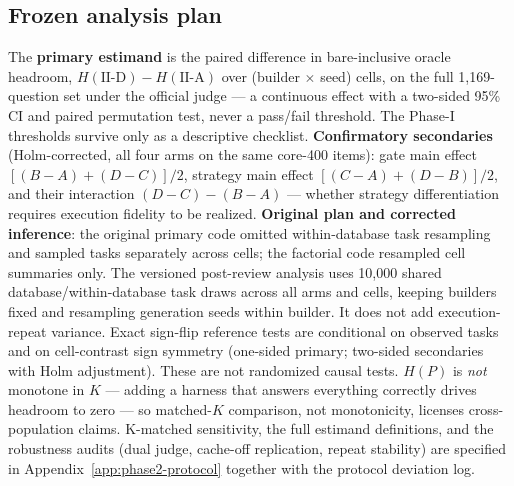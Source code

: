 \subsection{Frozen analysis plan}\label{sec:p2plan}
The \textbf{primary estimand} is the paired difference in bare-inclusive oracle
headroom, $H(\text{II-D}) - H(\text{II-A})$ over (builder $\times$ seed) cells, on
the full 1{,}169-question set under the official judge --- a continuous effect with
a two-sided 95\% CI and paired permutation test, never a pass/fail threshold. The
Phase-I thresholds survive only as a descriptive checklist.
\textbf{Confirmatory secondaries} (Holm-corrected, all four arms on the same
core-400 items): gate main effect $[(B{-}A)+(D{-}C)]/2$, strategy main effect
$[(C{-}A)+(D{-}B)]/2$, and their interaction $(D{-}C)-(B{-}A)$ --- whether strategy
differentiation requires execution fidelity to be realized.
\textbf{Original plan and corrected inference}: the original primary code
omitted within-database task resampling and sampled tasks separately across
cells; the factorial code resampled cell summaries only. The versioned
post-review analysis uses 10{,}000 shared database/within-database task
draws across all arms and cells, keeping builders fixed and resampling
generation seeds within builder. It does not add execution-repeat variance.
Exact sign-flip reference tests are conditional on observed tasks and on
cell-contrast sign symmetry (one-sided primary; two-sided secondaries with
Holm adjustment). These are not randomized causal tests. $H(P)$ is \emph{not} monotone
in $K$ --- adding a harness that answers everything correctly drives headroom to
zero --- so matched-$K$ comparison, not monotonicity, licenses cross-population
claims. K-matched sensitivity, the full estimand definitions, and the robustness
audits (dual judge, cache-off replication, repeat stability) are specified in
Appendix~\ref{app:phase2-protocol} together with the protocol deviation log.
